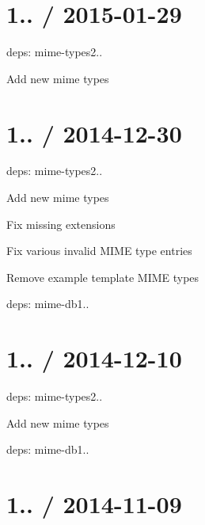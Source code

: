 \section*{1.. / 2015-\/01-\/29 }


\begin{DoxyItemize}
\item deps\+: mime-\/types2..
\begin{DoxyItemize}
\item Add new mime types
\end{DoxyItemize}
\end{DoxyItemize}

\section*{1.. / 2014-\/12-\/30 }


\begin{DoxyItemize}
\item deps\+: mime-\/types2..
\begin{DoxyItemize}
\item Add new mime types
\item Fix missing extensions
\item Fix various invalid M\+I\+ME type entries
\item Remove example template M\+I\+ME types
\item deps\+: mime-\/db1..
\end{DoxyItemize}
\end{DoxyItemize}

\section*{1.. / 2014-\/12-\/10 }


\begin{DoxyItemize}
\item deps\+: mime-\/types2..
\begin{DoxyItemize}
\item Add new mime types
\item deps\+: mime-\/db1..
\end{DoxyItemize}
\end{DoxyItemize}

\section*{1.. / 2014-\/11-\/09 }


